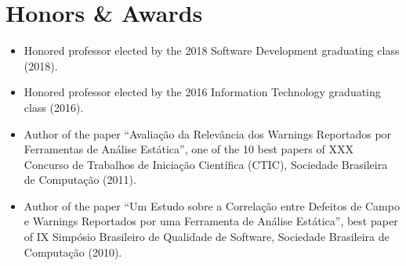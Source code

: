 \section*{Honors \& Awards}

\begin{itemize}
    \item Honored professor elected by the 2018 Software Development graduating class (2018).
    \item Honored professor elected by the 2016 Information Technology graduating class (2016).
    \item Author of the paper ``Avaliação da Relevância dos Warnings Reportados por Ferramentas de Análise Estática'', one of the 10 best papers of XXX Concurso de Trabalhos de Iniciação Científica (CTIC), Sociedade Brasileira de Computação (2011).
    \item Author of the paper ``Um Estudo sobre a Correlação entre Defeitos de Campo e Warnings Reportados por uma Ferramenta de Análise Estática'', best paper of IX Simpósio Brasileiro de Qualidade de Software, Sociedade Brasileira de Computação (2010).
\end{itemize}